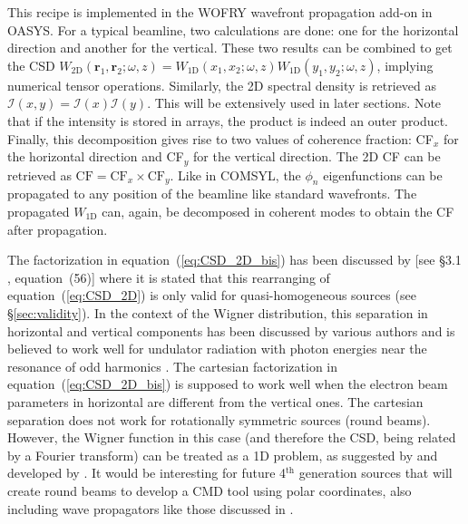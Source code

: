 \documentclass[preprint]{iucr}
\newcommand{\inred}[1]{{\color{red}#1}}
\begin{document}
This recipe is implemented in the WOFRY wavefront propagation add-on in OASYS. For a typical beamline, two calculations are done: one for the horizontal direction and another for the vertical. These two results can be combined to get the CSD $W_\text{2D}(\textbf{r}_1,\textbf{r}_2;\omega,z)=W_\text{1D}(x_1,x_2;\omega,z) W_\text{1D}(y_1,y_2;\omega,z)$, implying numerical tensor operations. Similarly, the 2D spectral density is retrieved as $\mathcal{I}(x,y)=\mathcal{I}(x) \mathcal{I}(y)$. This will be extensively used in later sections. Note that if \inred{the} intensity is stored in arrays, the product is indeed an outer product. Finally, this decomposition gives rise to two values of coherence fraction: CF$_x$ for the horizontal direction and CF$_y$ for the vertical direction. The 2D CF can be retrieved as $\text{CF}=\text{CF}_{x} \times \text{CF}_{y}$. Like in COMSYL, the $\phi_n$ eigenfunctions can be propagated to any position of the beamline like standard wavefronts.
The propagated $W_\text{1D}$ can, again, be decomposed in coherent modes to obtain the CF after propagation. 

The factori\inred{z}ation in equation~(\ref{eq:CSD_2D_bis}) has been discussed by  [see §3.1 , equation~(56)] where it is stated that this rearranging of equation~(\ref{eq:CSD_2D}) is only valid for quasi-homogeneous sources (see \S\ref{sec:validity}). In the context of the Wigner distribution, this separation in horizontal and vertical components has been discussed by various authors and is believed to work well for undulator radiation with photon energies near the resonance of odd
harmonics \cite{Bazarov2012,tanaka2014,nash2021}. 
The cartesian factori\inred{z}ation in equation~(\ref{eq:CSD_2D_bis}) is supposed to work well when the electron beam parameters in horizontal are different from the vertical ones. The cartesian separation does not work for rotationally symmetric sources (round beams). However, the Wigner function in this case (and therefore the CSD, being related by a Fourier transform) can be treated as \inred{a} 1D problem, as suggested by  and developed by . It would be interesting for future 4$^\text{th}$ generation sources that will create round beams to develop a CMD tool using polar coordinates, also including wave propagators like those discussed in \cite{LiJacobsen}. 
\end{document}
